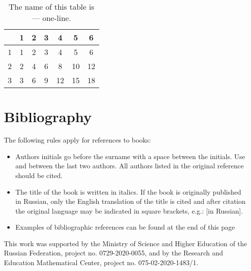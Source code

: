 \documentclass[
11pt,%
tightenlines,%
twoside,%
onecolumn,%
nofloats,%
nobibnotes,%
nofootinbib,%
superscriptaddress,%
noshowpacs,%
centertags]%
{revtex4}
\begin{document}
\begin{table}[!htb]
\setcaptionmargin{0mm}
\onelinecaptionstrue
{}
\caption{The name of this table is --- one-line.}
\bigskip
\begin{tabular}{|c|c|c|c|c|c|c|}
  \hline
    & 1 & 2 & 3 & 4 & 5 & 6\\
  \hline
  1 & 1 & 2 & 3 & 4 & 5 & 6\\
  2 & 2 & 4 & 6 & 8 & 10 & 12\\
  3 & 3 & 6 & 9 & 12 & 15 & 18\\[1mm]
  \hline
\end{tabular}
\end{table}

\section{Bibliography}
The following rules apply for references to books:

\begin{itemize}
  \item Authors initials go before the surname with a space between the initials. Use and between the last two authors. All authors listed in the original reference should be cited.
  \item The title of the book is written in italics. If the book is originally published in Russian, only the English translation of the title is cited and after citation the original language may be indicated in square brackets, e.g.: [in Russian].
  \item Examples of bibliographic references can be found at the end of this page %
\end{itemize}


\begin{acknowledgments}
This work was supported by the Ministry of Science and Higher Education of the Russian Federation, project no. 0729-2020-0055, and by the Research and Education Mathematical Center, project no. 075-02-2020-1483/1.
\end{acknowledgments}


%
%
\end{document}

